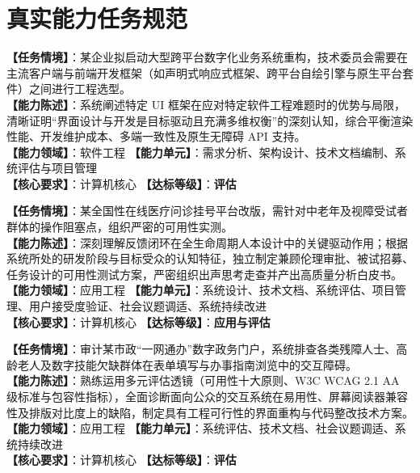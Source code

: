 \section{真实能力任务规范}

\begin{taskbox}[任务 1：现代用户界面开发框架横向技术选型与深度权衡对比]
\textbf{【任务情境】}：某企业拟启动大型跨平台数字化业务系统重构，技术委员会需要在主流客户端与前端开发框架（如声明式响应式框架、跨平台自绘引擎与原生平台套件）之间进行工程选型。\\
\textbf{【能力陈述】}：系统阐述特定 UI 框架在应对特定软件工程难题时的优势与局限，清晰证明“界面设计与开发是目标驱动且充满多维权衡”的深刻认知，综合平衡渲染性能、开发维护成本、多端一致性及原生无障碍 API 支持。\\
\textbf{【能力领域】}：软件工程 \quad \textbf{【能力单元】}：需求分析、架构设计、技术文档编制、系统评估与项目管理\\
\textbf{【核心要求】}：计算机核心 \quad \textbf{【达标等级】}：\textbf{评估}
\end{taskbox}

\begin{taskbox}
\textbf{【任务情境】}：某全国性在线医疗问诊挂号平台改版，需针对中老年及视障受试者群体的操作阻塞点，组织严密的可用性实测。\\
\textbf{【能力陈述】}：深刻理解反馈闭环在全生命周期人本设计中的关键驱动作用；根据系统所处的研发阶段与目标受众的认知特征，独立制定兼顾伦理审批、被试招募、任务设计的可用性测试方案，严密组织出声思考走查并产出高质量分析白皮书。\\
\textbf{【能力领域】}：应用工程 \quad \textbf{【能力单元】}：系统设计、技术文档、系统评估、项目管理、用户接受度验证、社会议题调适、系统持续改进\\
\textbf{【核心要求】}：计算机核心 \quad \textbf{【达标等级】}：\textbf{应用与评估}
\end{taskbox}

\begin{taskbox}
\textbf{【任务情境】}：审计某市政“一网通办”数字政务门户，系统排查各类残障人士、高龄老人及数字技能欠缺群体在表单填写与办事指南浏览中的交互障碍。\\
\textbf{【能力陈述】}：熟练运用多元评估透镜（可用性十大原则、W3C WCAG 2.1 AA 级标准与包容性指标），全面诊断面向公众的交互系统在易用性、屏幕阅读器兼容性及排版对比度上的缺陷，制定具有工程可行性的界面重构与代码整改技术方案。\\
\textbf{【能力领域】}：应用工程 \quad \textbf{【能力单元】}：系统评估、技术文档、社会议题调适、系统持续改进\\
\textbf{【核心要求】}：计算机核心 \quad \textbf{【达标等级】}：\textbf{评估}
\end{taskbox}

